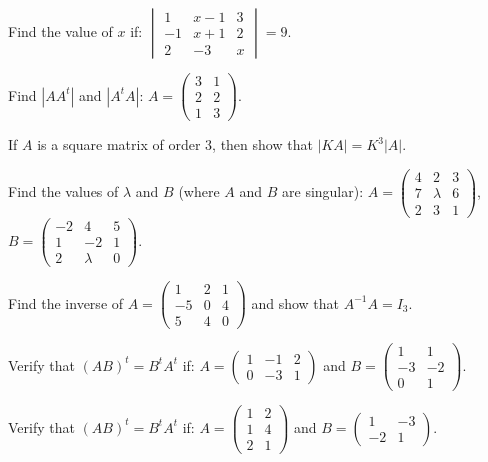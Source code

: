 \documentclass[11pt,a4paper]{article}
\begin{document}
\begin{longlist}
\item Find the value of $x$ if: $\begin{vmatrix}1 & x-1 & 3\\ -1 & x+1 & 2\\ 2 & -3 & x\end{vmatrix}=9$.

\item Find $|AA^t|$ and $|A^tA|$: $A=\begin{pmatrix}3 & 1\\ 2 & 2\\ 1 & 3\end{pmatrix}$.

\item If $A$ is a square matrix of order 3, then show that $|KA|=K^3|A|$.

\item Find the values of $\lambda$ and $B$ (where $A$ and $B$ are singular): $A=\begin{pmatrix}4 & 2 & 3\\ 7 & \lambda & 6\\ 2 & 3 & 1\end{pmatrix}$, $B=\begin{pmatrix}-2 & 4 & 5\\ 1 & -2 & 1\\ 2 & \lambda & 0\end{pmatrix}$.

\item Find the inverse of $A=\begin{pmatrix}1 & 2 & 1\\ -5 & 0 & 4\\ 5 & 4 & 0\end{pmatrix}$ and show that $A^{-1}A=I_3$.

\item Verify that $(AB)^t=B^tA^t$ if: $A=\begin{pmatrix}1 & -1 & 2\\ 0 & -3 & 1\end{pmatrix}$ and $B=\begin{pmatrix}1 & 1\\ -3 & -2\\ 0 & 1\end{pmatrix}$.

\item Verify that $(AB)^t=B^tA^t$ if: $A=\begin{pmatrix}1 & 2\\ 1 & 4\\ 2 & 1\end{pmatrix}$ and $B=\begin{pmatrix}1 & -3\\ -2 & 1\end{pmatrix}$.


\end{longlist}
\end{document}
